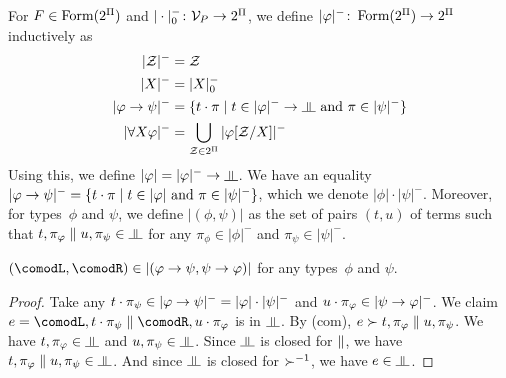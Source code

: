 \renewcommand{\sem}[1]{|{#1}|}
\newcommand{\nsem}[1]{\sem{#1}^-}
\newcommand{\sempair}[1]{\sem{(#1)}}
For $F\in\mathop{\text{Form}}(2^\Pi)$ and $|\cdot|^-_0\colon\mathcal V_P\rightarrow 2^\Pi$,
we define $\nsem{\phi}\colon \form(2^\Pi)\rightarrow
2^\Pi$ inductively as
\begin{align*}
 \nsem{\mathcal Z} &= \mathcal Z \\
 \nsem{X}&= |X|_0^- \\
 \nsem{\phi\imp\psi}&=
 \{t\cdot\pi\mid t\in\nsem\phi\rightarrow\bbot \text{ and }\pi\in\nsem\psi\}
 \\
 \nsem{\forall X\phi}&=
 \bigcup_{\mathcal Z\in 2^\Pi} \nsem{\phi[\mathcal Z/X]}
\end{align*}
Using this, we define $\sem \phi=\nsem{\phi}\rightarrow\bbot$.
We have an equality
$\nsem{\phi\imp\psi} = \{t\cdot\pi\mid
t\in\sem\phi\text{ and }\pi\in\nsem\psi\}$, which we denote
$\sem{\phi}\cdot\nsem{\psi}$.
Moreover, for types~$\phi$ and $\psi$, we define $\sempair{\phi,\psi}$
as the set of pairs $(t,u)$ of terms such that
$t,\pi_\phi\conc u,\pi_\psi\in\bbot$ for any $\pi_\phi\in\nsem\phi$
and $\pi_\psi\in\nsem\psi$.

\begin{proposition}
 \label{comod-type}
 $(\comodL, \comodR)\in\sempair{\phi\imp\psi,\psi\imp\phi}$
 for any types~$\phi$ and $\psi$.
\end{proposition}
\begin{proof}
 Take any $t\cdot\pi_\psi\in\nsem{\phi\imp\psi} =
 \sem\phi\cdot\nsem\psi$
 and $u\cdot\pi_\phi\in\nsem{\psi\imp\phi}$.
 We claim $e=\comodL,t\cdot\pi_\psi\conc\comodR,u\cdot\pi_\phi$ is in
 $\bbot$.
 By (com), $e\succ t,\pi_\varphi\parallel u,\pi_\psi$.
 We have $t,\pi_\phi\in\bbot$ and $u,\pi_\psi\in\bbot$.
 Since $\bbot$ is closed for $\parallel$,
 we have $t,\pi_\phi\conc u,\pi_\psi\in\bbot$.
 And since $\bbot$ is closed for $\succ^{-1}$,
 we have $e\in\bbot$.
\end{proof}

